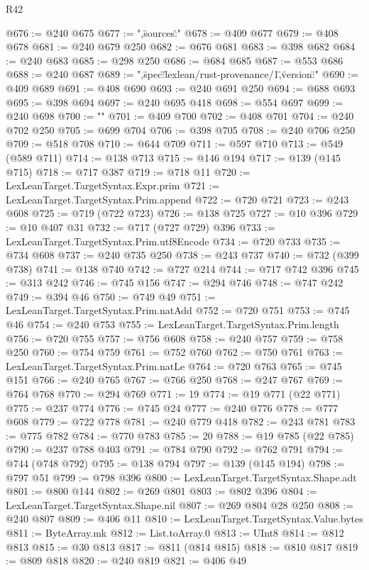 \begin{lexlean}{R42}
\begin{coremodule}
{@676 := @240 @675
@677 := ",\"sources\":"
@678 := @409 @677
@679 := @408 @678
@681 := @240 @679 @250
@682 := @676 @681
@683 := @398 @682
@684 := @240 @683
@685 := @298 @250
@686 := @684 @685
@687 := @553 @686
@688 := @240 @687
@689 := ",\"spec\":\"lexlean/rust-provenance/1\",\"version\":"
@690 := @409 @689
@691 := @408 @690
@693 := @240 @691 @250
@694 := @688 @693
@695 := @398 @694
@697 := @240 @695 @418
@698 := @554 @697
@699 := @240 @698
@700 := "}\n"
@701 := @409 @700
@702 := @408 @701
@704 := @240 @702 @250
@705 := @699 @704
@706 := @398 @705
@708 := @240 @706 @250
@709 := @518 @708
@710 := @644 @709
@711 := @597 @710
@713 := @549 (@589 @711)
@714 := @138 @713
@715 := @146 @194
@717 := @139 (@145 @715)
@718 := @717 @387
@719 := @718 @11
@720 := LexLeanTarget.TargetSyntax.Expr.prim
@721 := LexLeanTarget.TargetSyntax.Prim.append
@722 := @720 @721
@723 := @243 @608
@725 := @719 (@722 @723)
@726 := @138 @725
@727 := @10 @396
@729 := @10 @407 @31
@732 := @717 (@727 @729) @396
@733 := LexLeanTarget.TargetSyntax.Prim.utf8Encode
@734 := @720 @733
@735 := @734 @608
@737 := @240 @735 @250
@738 := @243 @737
@740 := @732 (@399 @738)
@741 := @138 @740
@742 := @727 @214
@744 := @717 @742 @396
@745 := @313 @242
@746 := @745 @156
@747 := @294 @746
@748 := @747 @242
@749 := @394 @46
@750 := @749 @49
@751 := LexLeanTarget.TargetSyntax.Prim.natAdd
@752 := @720 @751
@753 := @745 @46
@754 := @240 @753
@755 := LexLeanTarget.TargetSyntax.Prim.length
@756 := @720 @755
@757 := @756 @608
@758 := @240 @757
@759 := @758 @250
@760 := @754 @759
@761 := @752 @760
@762 := @750 @761
@763 := LexLeanTarget.TargetSyntax.Prim.natLe
@764 := @720 @763
@765 := @745 @151
@766 := @240 @765
@767 := @766 @250
@768 := @247 @767
@769 := @764 @768
@770 := @294 @769
@771 := 19
@774 := @19 @771 (@22 @771)
@775 := @237 @774
@776 := @745 @24
@777 := @240 @776
@778 := @777 @608
@779 := @722 @778
@781 := @240 @779 @418
@782 := @243 @781
@783 := @775 @782
@784 := @770 @783
@785 := 20
@788 := @19 @785 (@22 @785)
@790 := @237 @788 @403
@791 := @784 @790
@792 := @762 @791
@794 := @744 (@748 @792)
@795 := @138 @794
@797 := @139 (@145 @194)
@798 := @797 @51
@799 := @798 @396
@800 := LexLeanTarget.TargetSyntax.Shape.adt
@801 := @800 @144
@802 := @269 @801
@803 := @802 @396
@804 := LexLeanTarget.TargetSyntax.Shape.nil
@807 := @269 @804 @28 @250
@808 := @240 @807
@809 := @406 @11
@810 := LexLeanTarget.TargetSyntax.Value.bytes
@811 := ByteArray.mk
@812 := List.toArray.{0}
@813 := UInt8
@814 := @812 @813
@815 := @30 @813
@817 := @811 (@814 @815)
@818 := @810 @817
@819 := @809 @818
@820 := @240 @819
@821 := @406 @49

\end{coremodule}
\end{lexlean}

